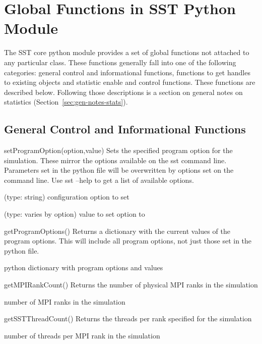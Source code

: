 \chapter{Global Functions in SST Python Module}
\label{chap:globals}

The SST core python module provides a set of global functions not
attached to any particular class. These functions generally fall into
one of the following categories: general control and informational
functions, functions to get handles to existing objects and statistic
enable and control functions.  These functions are described below.
Following those descriptions is a section on general notes on
statistics (Section~\ref{sec:gen-notes-stats}).

\section{General Control and Informational Functions}
\label{sec:sim-control}

\begin{functiondoc}{setProgramOption(option,value)}{
    Sets the specified program option for the simulation.  These
    mirror the options available on the sst command line.  Parameters
    set in the python file will be overwritten by options set on the
    command line.  Use sst --help to get a list of available options.
}

   (type: string) configuration option to set

   (type: varies by option) value to set option to

  \noreturn
\end{functiondoc}


\begin{functiondoc}{getProgramOptions()}{
    Returns a dictionary with the current values of the program
    options.  This will include all program options, not just those
    set in the python file.  }

  \returns python dictionary with program options and values
\end{functiondoc}


\begin{functiondoc}{getMPIRankCount()}{
    Returns the number of physical MPI ranks in the simulation
}
  
\returns number of MPI ranks in the simulation
\end{functiondoc}


\begin{functiondoc}{getSSTThreadCount()}{
    Returns the threads per rank specified for the simulation
}

  \returns number of threads per MPI rank in the simulation
\end{functiondoc}


